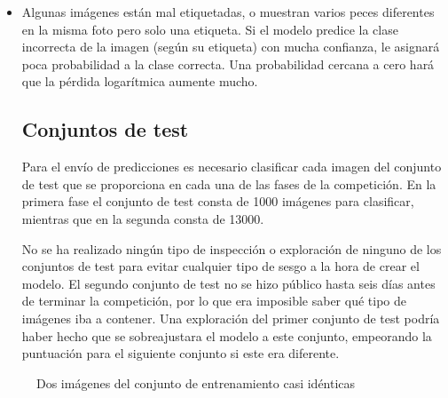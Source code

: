 \begin{itemize}
\item{Algunas imágenes están mal etiquetadas, o muestran varios peces
        diferentes en la misma foto pero solo una etiqueta. Si el modelo
        predice la clase incorrecta de la imagen (según su etiqueta) con mucha
        confianza, le asignará poca probabilidad a la clase correcta. Una
        probabilidad cercana a cero hará que la pérdida logarítmica aumente
    mucho.  }

\subsection{Conjuntos de test}

Para el envío de predicciones es necesario clasificar cada imagen del conjunto
de test que se proporciona en cada una de las fases de la competición. En la
primera fase el conjunto de test consta de 1000 imágenes para clasificar,
mientras que en la segunda consta de 13000.

No se ha realizado ningún tipo de inspección o exploración de ninguno de los
conjuntos de test para evitar cualquier tipo de sesgo a la hora de crear el
modelo. El segundo conjunto de test no se hizo público hasta seis días antes de
terminar la competición, por lo que era imposible saber qué tipo de imágenes
iba a contener. Una exploración del primer conjunto de test podría haber hecho
que se sobreajustara el modelo a este conjunto, empeorando la puntuación para
el siguiente conjunto si este era diferente.
        
\end{itemize}

\begin{figure}
  \caption{Dos imágenes del conjunto de entrenamiento casi idénticas}
\label{same_image}
\end{figure}
